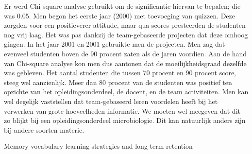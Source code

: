 \documentclass{voorstel}
\begin{document}
	Er werd Chi-square analyse gebruikt om de significantie hiervan te bepalen; die was 0.05.
	Men begon het eerste jaar (2000) met toevoeging van quizzen. Deze zorgden voor een positieverer attitude, maar qua scores presteerden de studenten nog vrij laag. Het was pas dankzij de team-gebaseerde projecten dat deze omhoog gingen.
	In het jaar 2001 en 2001 gebruikte men de projecten. Men zag dat evenveel studenten boven de 90 procent zaten als de jaren voordien. Aan de hand van Chi-square analyse kon men dus aantonen dat de moeilijkheidsgraad dezelfde was gebleven. Het aantal studenten die tussen 70 procent en 90 procent score, steeg wel aanzienlijk. Meer dan 80 procent van de studenten was positief ten opzichte van het opleidingsonderdeel, de docent, en de team activiteiten.
	Men kan wel degelijk vaststellen dat team-gebaseerd leren voordelen heeft bij het verwerken van grote hoeveelheden informatie. We moeten wel meegeven dat dit zo blijkt bij een opleidingsonderdeel microbiologie. Dit kan natuurlijk anders zijn bij andere soorten materie.
	
	Memory vocabulary learning strategies and long-term retention \autocite{Nemati2009}
	
\end{document}
